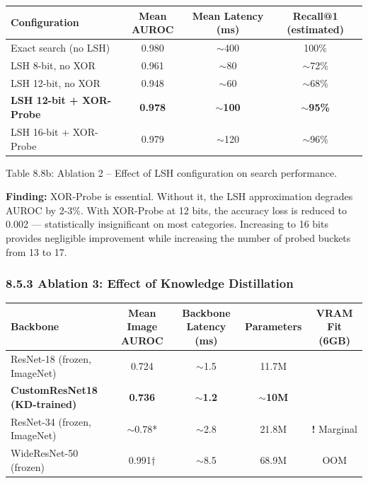 \documentclass[12pt, a4paper, oneside]{report}
\newcommand{\checkmark}{\ding{51}}
\newcommand{\texttimes}{\ding{55}}
\begin{document}
{\def\LTcaptype{none} %
\begin{longtable}[]{@{}lccc@{}}
\toprule\noalign{}
Configuration & Mean AUROC & Mean Latency (ms) & Recall@1 (estimated) \\
\midrule\noalign{}
\endhead
\bottomrule\noalign{}
\endlastfoot
Exact search (no LSH) & 0.980 & ${\sim}$400 & 100\% \\
LSH 8-bit, no XOR & 0.961 & ${\sim}$80 & ${\sim}$72\% \\
LSH 12-bit, no XOR & 0.948 & ${\sim}$60 & ${\sim}$68\% \\
\textbf{LSH 12-bit + XOR-Probe} & \textbf{0.978} & \textbf{${\sim}$100} & \textbf{${\sim}$95\%} \\
LSH 16-bit + XOR-Probe & 0.979 & ${\sim}$120 & ${\sim}$96\% \\
\end{longtable}
}

Table 8.8b: Ablation 2 -- Effect of LSH configuration on search performance.

\textbf{Finding:} XOR-Probe is essential. Without it, the LSH approximation degrades AUROC by 2-3\%. With XOR-Probe at 12 bits, the accuracy loss is reduced to 0.002 --- statistically insignificant on most categories. Increasing to 16 bits provides negligible improvement while increasing the number of probed buckets from 13 to 17.

\subsubsection{8.5.3 Ablation 3: Effect of Knowledge Distillation}\label{ablation-3-effect-of-knowledge-distillation}

{\def\LTcaptype{none} %
\begin{longtable}[]{@{}lcccc@{}}
\toprule\noalign{}
Backbone & Mean Image AUROC & Backbone Latency (ms) & Parameters & VRAM Fit (6GB) \\
\midrule\noalign{}
\endhead
\bottomrule\noalign{}
\endlastfoot
ResNet-18 (frozen, ImageNet) & 0.724 & ${\sim}$1.5 & 11.7M & \checkmark \\
\textbf{CustomResNet18 (KD-trained)} & \textbf{0.736} & \textbf{${\sim}$1.2} & \textbf{${\sim}$10M} & \textbf{\checkmark} \\
ResNet-34 (frozen, ImageNet) & ${\sim}$0.78* & ${\sim}$2.8 & 21.8M & \textbf{!} Marginal \\
WideResNet-50 (frozen) & 0.991† & ${\sim}$8.5 & 68.9M & \texttimes OOM \\
\end{longtable}
}
\end{document}
